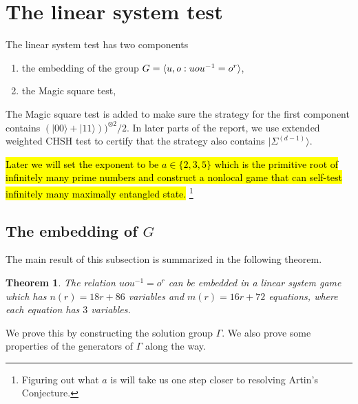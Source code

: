 \documentclass[11pt,letterpaper]{article}
\newcommand{\ket}[1]{|#1\rangle}
\newcommand{\x}{\otimes}
\DeclarePairedDelimiter{\ip}{\langle}{\rangle}
\newcommand{\Z}{\mathbb{Z}}
\newcommand{\1}{\mathbb{1}}
\newcommand{\EPR}[1]{\Sigma^{(#1)}}
\newtheorem{theorem}{Theorem}
\theoremstyle{definition}
\begin{document}
\section{The linear system test}
The linear system test has two components
\begin{enumerate} 
	\item the embedding of the group $G = \ip{u,o: uou^{-1} = o^r}$,
	\item the Magic square test,
\end{enumerate}
The Magic square test is added to make sure the strategy for the first component contains 
$(\ket{00}+\ket{11}))^{\x 2}/2$. 
In later parts of the report, we use extended weighted CHSH test to certify that the strategy also contains 
$\ket{\EPR{d-1}}$.

\hl{Later we will set the exponent to be $a \in \{2, 3, 5\}$ which is the primitive root of infinitely many prime numbers and
construct a nonlocal game that can self-test infinitely many maximally entangled state.}
\footnote{Figuring out what $a$ is will take us one step closer to resolving Artin's Conjecture\cite{murty1988}.}
\subsection{The embedding of $G$}
The main result of this subsection is summarized in the following theorem.
\begin{theorem}
	The relation $uou^{-1} = o^r$ can be embedded in a linear system game which has
	$n(r) = 18r+86$ variables and $m(r) = 16r + 72$ equations, where each equation has $3$ variables.
\end{theorem}
We prove this by constructing the solution group $\Gamma$. We also prove some properties of the generators of $\Gamma$
along the way.
\end{document}
